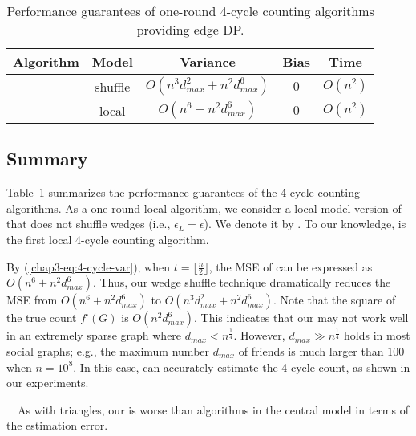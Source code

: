 \begin{table}[t]
  \caption[Performance guarantees of one-round 4-cycle counting algorithms providing edge DP.]
	{Performance guarantees of one-round 4-cycle counting algorithms providing edge DP.
  }
  
  \centering
  \begin{tabular}{|l|c|c|c|c|}
    \hline
    Algorithm & Model & Variance & Bias & Time \\ \hline
    \AlgWSCyc{} & shuffle & $O(n^3 d_{max}^2 + n^2 d_{max}^6)$ & $0$ & $O(n^2)$ \\ \hline
    \AlgWLCyc{} & local & $O(n^6 + n^2 d_{max}^6)$ & $0$ & $O(n^2)$ \\ \hline
  \end{tabular}
  \label{chap3-tab:upper_bounds_4cycle}
\end{table}

\subsection{Summary}
\label{chap3-sub:summary_4cycle}
Table~\ref{chap3-tab:upper_bounds_4cycle} summarizes the performance guarantees of the 4-cycle counting algorithms. 
As a one-round local algorithm, we consider a local model version of \AlgWSCyc{} that does not shuffle wedges (i.e., $\epsilon_L = \epsilon$). 
We denote it by \AlgWLCyc{}. 
To our knowledge, \AlgWLCyc{} is the first local 4-cycle counting algorithm. 

By (\ref{chap3-eq:4-cycle-var}), when $t = \lfloor \frac{n}{2} \rfloor$, the MSE of \AlgWLCyc{} can be expressed as $O(n^6 + n^2 d_{max}^6)$. 
Thus, our wedge shuffle technique dramatically reduces the MSE from $O(n^6 + n^2 d_{max}^6)$ to $O(n^3 d_{max}^2 + n^2 d_{max}^6)$. 
Note that the square of the true count $f^\square(G)$ is $O(n^2 d_{max}^6)$. 
This indicates that our \AlgWSCyc{} may not work well in an extremely sparse graph where $d_{max} < n^{\frac{1}{4}}$. 
However, $d_{max} \gg n^{\frac{1}{4}}$ holds in most social graphs; e.g., the maximum number $d_{max}$ of friends is much larger than $100$ when $n=10^8$. 
In this case, \AlgWSCyc{} can accurately estimate the 4-cycle count, as shown in our experiments. 

\smallskip
{}~~As with triangles, our \AlgWSCyc{} is worse than algorithms in the central model in terms of the estimation error. 

